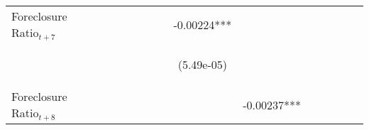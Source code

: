 \begin{table}
\begin{center}
{\begin{tabular}{lccccccccccccc}
Foreclosure Ratio$_{t+7}$  &    &  &  &  &  &  & -0.00224*** &  &  &  &  &  \\
\vspace{4pt}  & \begin{footnotesize}\end{footnotesize} & \begin{footnotesize}\end{footnotesize} & \begin{footnotesize}\end{footnotesize} & \begin{footnotesize}\end{footnotesize} & \begin{footnotesize}\end{footnotesize} & \begin{footnotesize}\end{footnotesize} & \begin{footnotesize}(5.49e-05)\end{footnotesize} & \begin{footnotesize}\end{footnotesize} & \begin{footnotesize}\end{footnotesize} & \begin{footnotesize}\end{footnotesize} & \begin{footnotesize}\end{footnotesize} & \begin{footnotesize}\end{footnotesize} \\
Foreclosure Ratio$_{t+8}$  &    &  &  &  &  &  &  & -0.00237*** &  &  &  &  \\

\end{tabular}}
\end{center}
\end{table}
